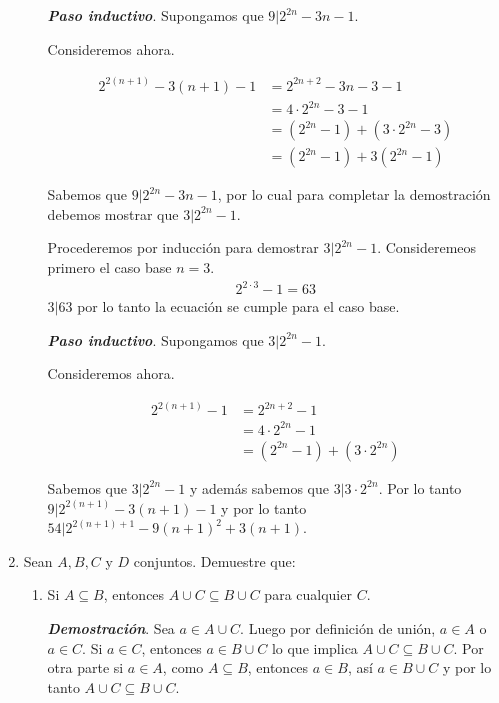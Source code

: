 \documentclass{report}
\begin{document}
\begin{enumerate}
\begin{enumerate}
            \textit{\textbf{Paso inductivo}}. Supongamos que $9|2^{2n} -3n -1$.

            Consideremos ahora.

            \begin{align*}
                2^{2(n+1)} -3(n+1) -1 &= 2^{2n +2} -3n -3 -1\\
                &= 4 \cdot 2^{2n} -3 -1\\
                &= (2^{2n} -1) + (3\cdot 2^{2n} -3)\\
                &= (2^{2n} -1) + 3(2^{2n} - 1)
            \end{align*}

            Sabemos que $9|2^{2n} -3n -1$, por lo cual para completar la demostración debemos mostrar que $3|2^{2n} - 1$.

            Procederemos por inducción para demostrar $3|2^{2n} - 1$. Consideremeos primero el caso base $n=3$.
            \begin{align*}
                2^{2\cdot 3} -1 = 63
            \end{align*}
            $3|63$ por lo tanto la ecuación se cumple para el caso base.

            \textit{\textbf{Paso inductivo}}. Supongamos que $3|2^{2n} - 1$.

            Consideremos ahora.

            \begin{align*}
                2^{2(n+1)} - 1 &= 2^{2n+2} -1\\
                &= 4\cdot 2^{2n} -1 \\
                &= (2^{2n}-1) + (3\cdot 2^{2n})
            \end{align*}

            Sabemos que $3|2^{2n} - 1$ y además sabemos que $3|3\cdot 2^{2n}$. Por lo tanto $9|2^{2(n+1)} -3(n+1) -1$ y por lo tanto $54|2^{2(n+1)+1} - 9(n+1)^2 + 3(n+1)$.

        \end{enumerate}

        \item Sean $A, B, C$ y $D$ conjuntos. Demuestre que:

        \begin{enumerate}
            \item Si $A \subseteq B$, entonces $A \cup C \subseteq B \cup C$ para cualquier $C$.

            \textit{\textbf{Demostración}}. Sea $a \in A \cup C$. Luego por definición de unión, $a \in A$ o $a \in C$. Si $a \in C$, entonces $a \in B \cup C$ lo que implica $A \cup C \subseteq B \cup C$. Por otra parte si $a \in A$, como $A \subseteq B$, entonces $a \in B$, así $a \in B \cup C$ y por lo tanto $A \cup C \subseteq B \cup C$.


\end{enumerate}
\end{enumerate}
\end{document}
